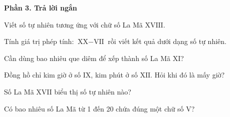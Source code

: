 \textbf{Phần 3. Trả lời ngắn}

\begin{ex} %
Viết số tự nhiên tương ứng với chữ số La Mã $\text{XVIII}$.
\end{ex}

\begin{ex} %
Tính giá trị phép tính: $\text{XX} - \text{VII}$ rồi viết kết quả dưới dạng số tự nhiên.
\end{ex}

\begin{ex} %
Cần dùng bao nhiêu que diêm để xếp thành số La Mã $\text{XI}$?
\end{ex}

\begin{ex} %
Đồng hồ chỉ kim giờ ở số $\text{IX}$, kim phút ở số $\text{XII}$. Hỏi khi đó là mấy giờ?
\end{ex}

\begin{ex} %
Số La Mã $\text{XVII}$ biểu thị số tự nhiên nào?
\end{ex}

\begin{ex} %
Có bao nhiêu số La Mã từ 1 đến 20 chứa đúng một chữ số $\text{V}$?
\end{ex}
